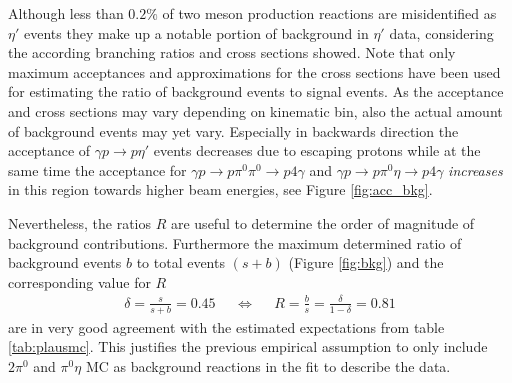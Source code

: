 Although less than $0.2\%$ of two meson production reactions are misidentified as $\eta'$ events they make up a notable portion of background in $\eta'$ data, considering the according branching ratios and cross sections showed. Note that only maximum acceptances and approximations for the cross sections have been used for estimating the  ratio of background events to signal events. As the acceptance and cross sections may vary depending on kinematic bin, also the actual amount of background events may yet vary. Especially in backwards direction the acceptance of $\gamma p \to p\eta'$ events decreases due to escaping protons while at the same time the acceptance for $\gamma p \to p\pi^0\pi^0\to p4\gamma$ and $\gamma p \to p \pi^0\eta\to p 4\gamma$ \emph{increases} in this region towards higher beam energies, see Figure \ref{fig:acc_bkg}. 

Nevertheless, the ratios $R$ are useful to determine the order of magnitude of background contributions. Furthermore the maximum determined ratio of  background events $b$ to total events $\left(s+b\right)$ (Figure \ref{fig:bkg}) and the corresponding value for $R$
\begin{align}
\delta=\frac{s}{s+b}=0.45&&\Leftrightarrow&&R=\frac{b}{s}=\frac{\delta}{1-\delta}=0.81
\end{align} are in very good agreement with the estimated expectations from table \ref{tab:plausmc}. This justifies the previous empirical assumption to only include $2\pi^0$ and $\pi^0\eta$ MC as background reactions in the fit to describe the data.
   
